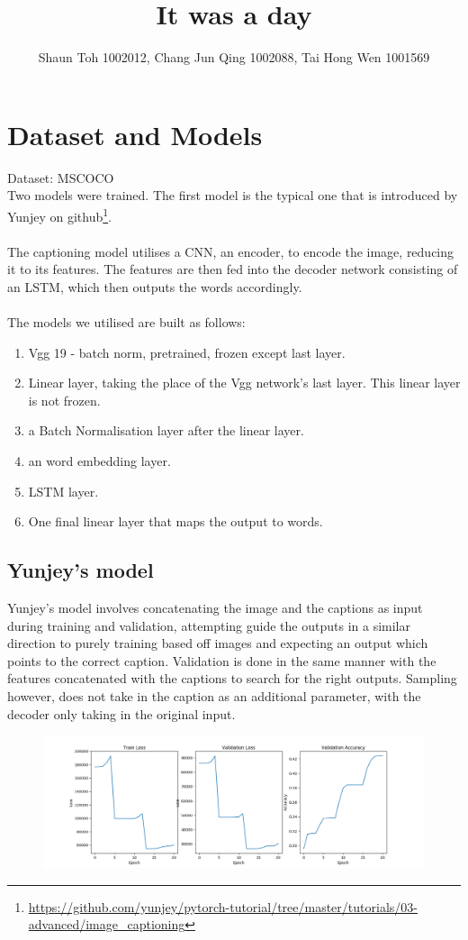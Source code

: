 \documentclass{proc}
\author{Shaun Toh 1002012, Chang Jun Qing 1002088, Tai Hong Wen 1001569}
\title{It was a day}
\begin{document}
\maketitle
\section{Dataset and Models}
Dataset: MSCOCO\\
Two models were trained. The first model is the typical one that is introduced by Yunjey on github\footnote{\url{https://github.com/yunjey/pytorch-tutorial/tree/master/tutorials/03-advanced/image_captioning}}. 
\paragraph{} The captioning model utilises a CNN, an encoder, to encode the image, reducing it to its features. The features are then fed into the decoder network consisting of an LSTM, which then outputs the words accordingly.
\paragraph{} The models we utilised are built as follows:
\begin{enumerate}
\item Vgg 19 - batch norm, pretrained, frozen except last layer.
\item Linear layer, taking the place of the Vgg network's last layer. This linear layer is not frozen.
\item a Batch Normalisation layer after the linear layer.
\item an word embedding layer.
\item LSTM layer.
\item One final linear layer that maps the output to words.
\end{enumerate}

\subsection{Yunjey's model}
Yunjey's model involves concatenating the image and the captions as input during training and validation, attempting guide the outputs in a similar direction to purely training based off images and expecting an output which points to the correct caption. Validation is done in the same manner with the features concatenated with the captions to search for the right outputs. Sampling however, does not take in the caption as an additional parameter, with the decoder only taking in the original input.\\
\begin{figure}[h!]
  \includegraphics[width=\linewidth]{image_n_cap.png}
\end{figure}
\end{document}
